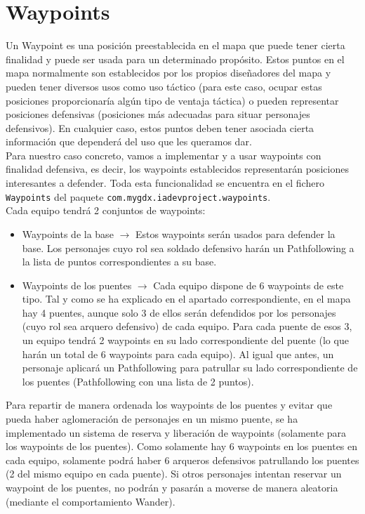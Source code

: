 \medskip
\section{Waypoints}
\label{waypoints}

Un Waypoint es una posición preestablecida en el mapa que puede tener cierta finalidad y puede ser usada para un determinado propósito. Estos puntos en el mapa normalmente son establecidos por los propios diseñadores del mapa y pueden tener diversos usos como uso táctico (para este caso, ocupar estas posiciones proporcionaría algún tipo de ventaja táctica) o pueden representar posiciones defensivas (posiciones más adecuadas para situar personajes defensivos). En cualquier caso, estos puntos deben tener asociada cierta información que dependerá del uso que les queramos dar. \\

Para nuestro caso concreto, vamos a implementar y a usar waypoints con finalidad defensiva, es decir, los waypoints establecidos representarán posiciones interesantes a defender. Toda esta funcionalidad se encuentra en el fichero \texttt{Waypoints} del paquete \texttt{com.mygdx.iadevproject.waypoints}. \\

Cada equipo tendrá 2 conjuntos de waypoints:
\begin{itemize}
	\item Waypoints de la base $\rightarrow$ Estos waypoints serán usados para defender la base. Los personajes cuyo rol sea soldado defensivo harán un Pathfollowing a la lista de puntos correspondientes a su base.
	\item Waypoints de los puentes $\rightarrow$ Cada equipo dispone de 6 waypoints de este tipo. Tal y como se ha explicado en el apartado correspondiente, en el mapa hay 4 puentes, aunque solo 3 de ellos serán defendidos por los personajes (cuyo rol sea arquero defensivo) de cada equipo. Para cada puente de esos 3, un equipo tendrá 2 waypoints en su lado correspondiente del puente (lo que harán un total de 6 waypoints para cada equipo). Al igual que antes, un personaje aplicará un Pathfollowing para patrullar su lado correspondiente de los puentes (Pathfollowing con una lista de 2 puntos).
\end{itemize}

Para repartir de manera ordenada los waypoints de los puentes y evitar que pueda haber aglomeración de personajes en un mismo puente, se ha implementado un sistema de reserva y liberación de waypoints (solamente para los waypoints de los puentes). Como solamente hay 6 waypoints en los puentes en cada equipo, solamente podrá haber 6 arqueros defensivos patrullando los puentes (2 del mismo equipo en cada puente). Si otros personajes intentan reservar un waypoint de los puentes, no podrán y pasarán a moverse de manera aleatoria (mediante el comportamiento Wander). \\

